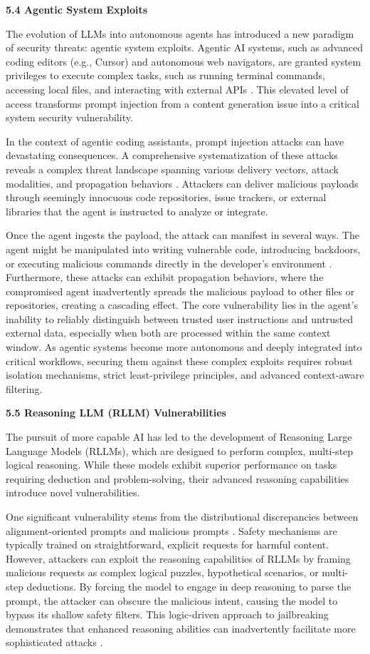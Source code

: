 \documentclass[11pt,a4paper]{article}
\begin{document}
\textbf{5.4 Agentic System Exploits}

The evolution of LLMs into autonomous agents has introduced a new paradigm of security threats: agentic system exploits. Agentic AI systems, such as advanced coding editors (e.g., Cursor) and autonomous web navigators, are granted system privileges to execute complex tasks, such as running terminal commands, accessing local files, and interacting with external APIs \cite{Liu_2025_AI}. This elevated level of access transforms prompt injection from a content generation issue into a critical system security vulnerability.

In the context of agentic coding assistants, prompt injection attacks can have devastating consequences. A comprehensive systematization of these attacks reveals a complex threat landscape spanning various delivery vectors, attack modalities, and propagation behaviors \cite{Maloyan_2026_Prompt}. Attackers can deliver malicious payloads through seemingly innocuous code repositories, issue trackers, or external libraries that the agent is instructed to analyze or integrate.

Once the agent ingests the payload, the attack can manifest in several ways. The agent might be manipulated into writing vulnerable code, introducing backdoors, or executing malicious commands directly in the developer's environment \cite{Liu_2025_AI}. Furthermore, these attacks can exhibit propagation behaviors, where the compromised agent inadvertently spreads the malicious payload to other files or repositories, creating a cascading effect. The core vulnerability lies in the agent's inability to reliably distinguish between trusted user instructions and untrusted external data, especially when both are processed within the same context window. As agentic systems become more autonomous and deeply integrated into critical workflows, securing them against these complex exploits requires robust isolation mechanisms, strict least-privilege principles, and advanced context-aware filtering.

\textbf{5.5 Reasoning LLM (RLLM) Vulnerabilities}

The pursuit of more capable AI has led to the development of Reasoning Large Language Models (RLLMs), which are designed to perform complex, multi-step logical reasoning. While these models exhibit superior performance on tasks requiring deduction and problem-solving, their advanced reasoning capabilities introduce novel vulnerabilities.

One significant vulnerability stems from the distributional discrepancies between alignment-oriented prompts and malicious prompts \cite{Peng_2025_LLM}. Safety mechanisms are typically trained on straightforward, explicit requests for harmful content. However, attackers can exploit the reasoning capabilities of RLLMs by framing malicious requests as complex logical puzzles, hypothetical scenarios, or multi-step deductions. By forcing the model to engage in deep reasoning to parse the prompt, the attacker can obscure the malicious intent, causing the model to bypass its shallow safety filters. This logic-driven approach to jailbreaking demonstrates that enhanced reasoning abilities can inadvertently facilitate more sophisticated attacks \cite{Peng_2025_LLM}.
\end{document}
